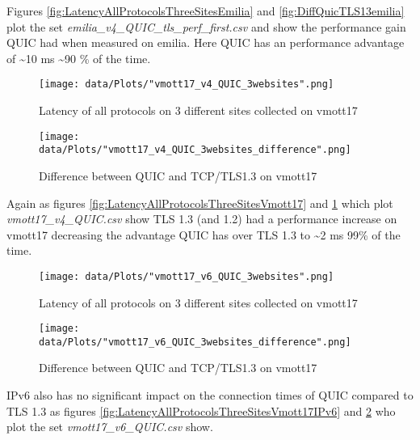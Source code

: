 Figures \ref{fig:LatencyAllProtocolsThreeSitesEmilia} and \ref{fig:DiffQuicTLS13emilia} plot the set \textit{emilia\_v4\_QUIC\_tls\_perf\_first.csv} and show the performance gain QUIC had when measured on emilia.
Here QUIC has an performance advantage of \textasciitilde 10 ms \textasciitilde 90 \% of the time.


\begin{figure}[!thb]
	\centering
	\begin{minipage}{.45\textwidth}
		\centering
		\texttt{[image: data/Plots/"vmott17\_v4\_QUIC\_3websites".png]}
		\caption{Latency of all protocols on 3 different sites collected on vmott17}
  		\label{fig:LatencyAllProtocolsThreeSitesVmott17}
  	\end{minipage}%
  	\hspace{0.5cm}
  	\begin{minipage}{.45\textwidth}
  		\centering
  		\texttt{[image: data/Plots/"vmott17\_v4\_QUIC\_3websites\_difference".png]}
		\caption{Difference between QUIC and TCP/TLS1.3 on vmott17}
  		\label{fig:DiffQuicTLS13Vmott17}
  	\end{minipage}
\end{figure}

Again as figures \ref{fig:LatencyAllProtocolsThreeSitesVmott17} and \ref{fig:DiffQuicTLS13Vmott17} which plot \textit{vmott17\_v4\_QUIC.csv} show TLS 1.3 (and 1.2) had a performance increase on vmott17 decreasing the advantage QUIC has over TLS 1.3 to \textasciitilde 2 ms 99\% of the time.

\begin{figure}[!thb]
	\centering
	\begin{minipage}{.45\textwidth}
  		\centering
		\texttt{[image: data/Plots/"vmott17\_v6\_QUIC\_3websites".png]}
		\caption{Latency of all protocols on 3 different sites collected on vmott17}
  		\label{fig:LatencyAllProtocolsThreeSitesVmott17IPv6}
  	\end{minipage}%
  	\hspace{0.5cm}
  	\begin{minipage}{.45\textwidth}
  		\centering
  		\texttt{[image: data/Plots/"vmott17\_v6\_QUIC\_3websites\_difference".png]}
		\caption{Difference between QUIC and TCP/TLS1.3 on vmott17}
  		\label{fig:DiffQuicTLS13Vmott17IPv6}
  	\end{minipage}
\end{figure}

IPv6 also has no significant impact on the connection times of QUIC compared to TLS 1.3 as figures \ref{fig:LatencyAllProtocolsThreeSitesVmott17IPv6} and \ref{fig:DiffQuicTLS13Vmott17IPv6} who plot the set \textit{vmott17\_v6\_QUIC.csv} show.